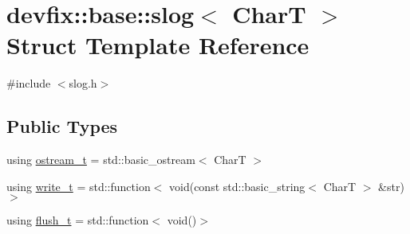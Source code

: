\hypertarget{structdevfix_1_1base_1_1slog}{}\section{devfix\+:\+:base\+:\+:slog$<$ CharT $>$ Struct Template Reference}
\label{structdevfix_1_1base_1_1slog}


{\ttfamily \#include $<$slog.\+h$>$}

\subsection*{Public Types}
\begin{DoxyCompactItemize}
\item 
using \hyperlink{structdevfix_1_1base_1_1slog_a3602226e6adc9ea19626e25a0df085a6}{ostream\+\_\+t} = std\+::basic\+\_\+ostream$<$ CharT $>$
\item 
using \hyperlink{structdevfix_1_1base_1_1slog_a5897ebe6b65ffd7a1845a6bca989f288}{write\+\_\+t} = std\+::function$<$ void(const std\+::basic\+\_\+string$<$ CharT $>$ \&str)$>$
\item 
using \hyperlink{structdevfix_1_1base_1_1slog_a5c957ca5d7392786ede9f813ec40fb40}{flush\+\_\+t} = std\+::function$<$ void()$>$
\end{DoxyCompactItemize}
